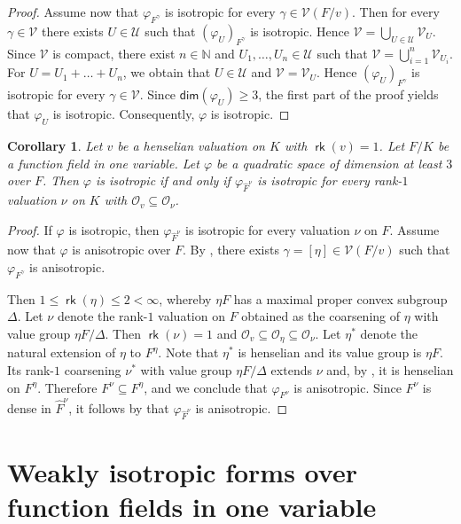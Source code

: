 \documentclass[twoside,11pt]{amsart}
\numberwithin{equation}{section}
\newtheorem{cor}[equation]{Corollary}
\theoremstyle{definition}
\renewcommand{\dim}{\operatorname{\mathsf{dim}}}
\newcommand{\vf}{\varphi}
\newcommand{\nat}{\mathbb{N}}
\renewcommand{\leq}{\leqslant}
\renewcommand{\geq}{\geqslant}
\newcommand\rk{\operatorname{\mathsf{rk}}}
\newcommand{\mc}{\mathcal}
\renewcommand{\dim}{\mathsf{dim}}
\renewcommand{\leq}{\leqslant}
\renewcommand{\geq}{\geqslant}
\begin{document}
\begin{proof}
Assume now that $\vf_{F^{\gamma}}$ is isotropic for every $\gamma\in \mc{V}(F/v)$. 
Then for every $\gamma\in \mc{V}$ there exists $U\in \mc{U}$ such that $(\vf_U)_{F^\gamma}$ is isotropic. 
Hence $\mc{V}=\bigcup_{U\in \mc{U}}\mc{V}_U$. 
Since $\mc{V}$ is compact, there exist $n\in\nat$ and $U_1, \dots, U_n\in \mc{U}$ such that $\mc{V}=\bigcup_{i=1}^n\mc{V}_{U_i}$. 
For $U=U_1+\dots+U_n$, we obtain that $U\in \mc{U}$ and $\mc{V}=\mc{V}_U$.
Hence $(\vf_U)_{F^\gamma}$ is isotropic for every $\gamma\in\mc{V}$.
Since $\dim(\vf_U)\geq 3$, the first part of the proof yields that $\vf_U$ is isotropic.
Consequently, $\vf$ is isotropic.
\end{proof}

\begin{cor}

    Let $v$ be a henselian valuation on $K$ with $\rk(v)=1$.
Let $F/K$ be a function field in one variable.
Let $\vf$ be a quadratic space of dimension at least $3$ over $F$. Then $\vf$ is isotropic if and only if $\vf_{\hat{F}^\nu}$ is isotropic for every rank-$1$ valuation $\nu$ on $K$ with $\mc{O}_v\subseteq\mc{O}_\nu$.

\end{cor}
\begin{proof}
   
If $\vf$ is isotropic, then $\vf_{\hat{F}^\nu}$ is isotropic for every valuation $\nu$ on $F$.
Assume now that $\vf$ is anisotropic over $F$.
By , there exists $\gamma=[\eta]\in \mc{V}(F/v)$ such that $\vf_{F^{\gamma}}$ is anisotropic.

Then $1\leq \rk(\eta)\leq 2<\infty$, whereby $\eta F$ has a  maximal proper convex subgroup $\Delta$. 
Let $\nu$ denote the rank-$1$ valuation on $F$ obtained as the coarsening of $\eta$ with value group $\eta F/\Delta$. 
Then $\rk(\nu)=1$ and $\mc{O}_v\subseteq\mc{O}_\eta\subseteq \mc{O}_\nu$.
Let $\eta^\ast$ denote the natural extension of $\eta$ to $F^\eta$.
Note that $\eta^\ast$ is henselian and its value group is $\eta F$.
Its rank-$1$ coarsening $\nu^\ast$ with value group $\eta F/\Delta$ extends $\nu$
 and, by \cite[Cor.~4.1.4]{EP05}, it is henselian on $F^\eta$.
Therefore $F^\nu\subseteq F^\eta$, and we conclude that $\vf_{F^\nu}$ is anisotropic.
Since $F^\nu$ is dense in $\hat{F}^\nu$, it  follows by \cite[Lemma 3.16]{Meh19} that $\vf_{\hat{F}^\nu}$ is anisotropic.
\end{proof}


\section{Weakly isotropic forms over function fields in one variable}
\end{document}
